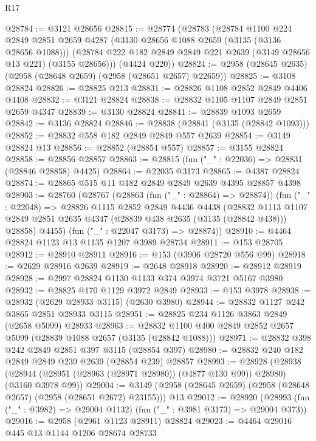 \begin{lexlean}{R17}
\begin{coremodule}
@28784 := @3121 @28656
@28815 := @28774
    (@28783
      (@28784
        @1100
        @224
        @2849
        @2851
        @2659
        @4287
        (@3130 @28656 @1088 @2659 (@3135 (@3136 @28656 @1088)))
        (@28784 @222 @182 @2849 @2849 @221 @2639 (@3149 @28656 @13 @221) (@3155 @28656)))
      (@4424 @220))
@28824 := @2958 (@28645 @2635) (@2958 (@28648 @2659) (@2958 (@28651 @2657) @22659))
@28825 := @3108 @28824
@28826 := @28825 @213
@28831 := @28826 @1108 @2852 @2849 @4406 @4408
@28832 := @3121 @28824
@28838 := @28832 @1105 @1107 @2849 @2851 @2659 @4347
@28839 := @3130 @28824
@28841 := @28839 @1093 @2659
@28842 := @3136 @28824
@28846 := @28838 (@28841 (@3135 (@28842 @1093)))
@28852 := @28832 @558 @182 @2849 @2849 @557 @2639
@28854 := @3149 @28824 @13
@28856 := @28852 (@28854 @557)
@28857 := @3155 @28824
@28858 := @28856 @28857
@28863 := @28815 (fun ("_" : @22036) => @28831 (@28846 @28858) @4425)
@28864 := @22035 @3173
@28865 := @4387 @28824
@28874 := @28865 @515 @11 @182 @2849 @2849 @2639 @4395 @28857 @4398
@28903 := @28760
    (@28767
      (@28863 (fun ("_" : @28864) => @28874))
      (fun ("_" : @22048) =>
      @28826
        @1115
        @2852
        @2849
        @4436
        @4438
        (@28832
          @1113
          @1107
          @2849
          @2851
          @2635
          @4347
          (@28839 @438 @2635 (@3135 (@28842 @438)))
          @28858)
        @4455)
      (fun ("_" : @22047 @3173) => @28874))
@28910 := @4464 @28824 @1123 @13 @1135 @1207 @3989 @28734
@28911 := @153 @28705
@28912 := @28910 @28911
@28916 := @153 (@3906 @28720 @556 @99)
@28918 := @2629 @28916 @2639
@28919 := @2648 @28918
@28920 := @28912 @28919
@28928 := @2997 @28824 @1130 @1133 @374 @3974 @3721 @5167 @3980
@28932 := @28825 @170 @1129 @3972 @2849
@28933 := @153 @3978
@28938 := @28932 (@2629 @28933 @3115) (@2630 @3980)
@28944 := @28832 @1127 @242 @3865 @2851 @28933 @3115
@28951 := @28825 @234 @1126 @3863 @2849 (@2658 @5099) @28933
@28963 := @28832 @1100 @400 @2849 @2852 @2657 @5099 (@28839 @1088 @2657 (@3135 (@28842 @1088)))
@28971 := @28832 @398 @242 @2849 @2851 @397 @3115 (@28854 @397)
@28980 := @28832 @240 @182 @2849 @2849 @239 @2639 (@28854 @239) @28857
@28993 := @28928
    (@28938 (@28944 (@28951 (@28963 (@28971 @28980)) (@4877 @130 @99)) @28980) (@3160 @3978 @99))
@29004 := @3149 (@2958 (@28645 @2659) (@2958 (@28648 @2657) (@2958 (@28651 @2672) @23155))) @13
@29012 := @28920
    (@28993 (fun ("_" : @3982) => @29004 @1132) (fun ("_" : @3981 @3173) => @29004 @373))
@29016 := @2958 (@2961 @1123 @28911) @28824
@29023 := @4464 @29016 @445 @13 @1144 @1206 @28674 @28733

\end{coremodule}
\end{lexlean}
